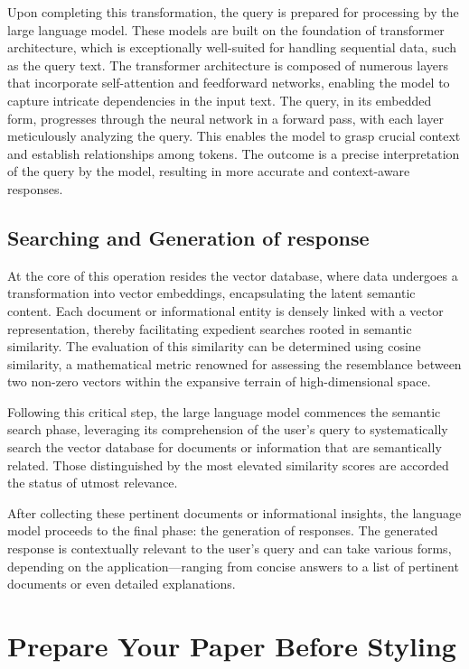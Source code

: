 \documentclass[conference]{IEEEtran}
\begin{document}
Upon completing this transformation, the query is prepared for processing by the large language model. These models are built on the foundation of transformer architecture, which is exceptionally well-suited for handling sequential data, such as the query text. The transformer architecture is composed of numerous layers that incorporate self-attention and feedforward networks, enabling the model to capture intricate dependencies in the input text. The query, in its embedded form, progresses through the neural network in a forward pass, with each layer meticulously analyzing the query. This enables the model to grasp crucial context and establish relationships among tokens. The outcome is a precise interpretation of the query by the model, resulting in more accurate and context-aware responses.

\subsection{Searching and Generation of response}
At the core of this operation resides the vector database, where data undergoes a transformation into vector embeddings, encapsulating the latent semantic content. Each document or informational entity is densely linked with a vector representation, thereby facilitating expedient searches rooted in semantic similarity. The evaluation of this similarity can be determined using cosine similarity, a mathematical metric renowned for assessing the resemblance between two non-zero vectors within the expansive terrain of high-dimensional space.

Following this critical step, the large language model commences the semantic search phase, leveraging its comprehension of the user's query to systematically search the vector database for documents or information that are semantically related. Those distinguished by the most elevated similarity scores are accorded the status of utmost relevance.

After collecting these pertinent documents or informational insights, the language model proceeds to the final phase: the generation of responses. The generated response is contextually relevant to the user's query and can take various forms, depending on the application—ranging from concise answers to a list of pertinent documents or even detailed explanations.



\section{Prepare Your Paper Before Styling}
\end{document}
